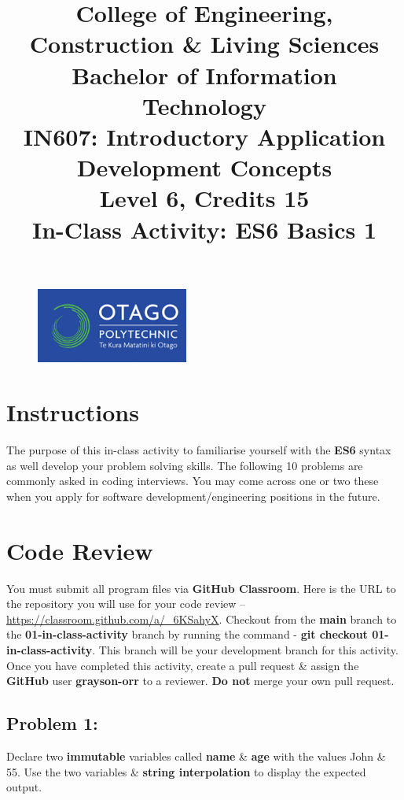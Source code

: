 \documentclass{article}
\author{}
\begin{document}
\begin{figure}
    \centering
    \includegraphics[width=50mm]{../img/logo.png}
\end{figure}

\title{College of Engineering, Construction \& Living Sciences\\Bachelor of Information Technology\\IN607: Introductory Application Development Concepts\\Level 6, Credits 15\\\textbf{In-Class Activity: ES6 Basics 1}}
\date{}
\maketitle
 
\section*{Instructions}
The purpose of this in-class activity to familiarise yourself with the \textbf{ES6} syntax as well develop your problem solving skills. The following 10 problems are commonly asked in coding interviews. You may come across one or two these when you apply for software development/engineering positions in the future.

\section*{Code Review}
You must submit all program files via \textbf{GitHub Classroom}. Here is the URL to the repository you will use for your code review – \href{https://classroom.github.com/a/_6KSahyX}{https://classroom.github.com/a/_6KSahyX}. Checkout from the \textbf{main} branch to the \textbf{01-in-class-activity} branch by running the command - \textbf{git checkout 01-in-class-activity}. This branch will be your development branch for this activity. Once you have completed this activity, create a pull request \& assign the \textbf{GitHub} user \textbf{grayson-orr} to a reviewer. \textbf{Do not} merge your own pull request.

\subsection*{Problem 1:} 
Declare two \textbf{immutable} variables called \textbf{name} \& \textbf{age} with the values John \& 55. Use the two variables \& \textbf{string interpolation} to display the expected output. 
\end{document}
